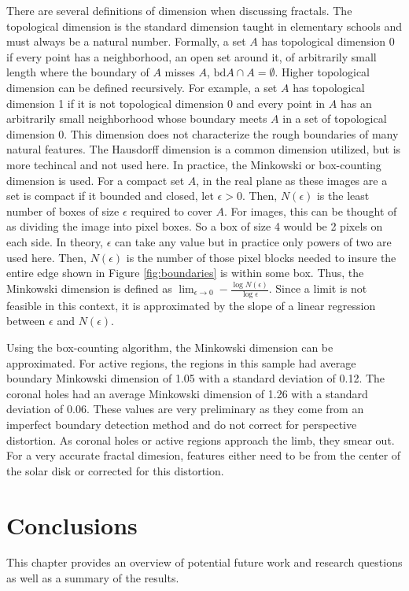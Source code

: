 \documentclass[twoside]{report}
\begin{document}
There are several definitions of dimension when discussing fractals. The topological dimension is the standard dimension taught in elementary schools and must always be a natural number. Formally, a set $A$ has topological dimension 0 if every point has a neighborhood, an open set around it, of arbitrarily small length where the boundary of $A$ misses $A$, $\text{bd} A \cap A = \emptyset$. Higher topological dimension can be defined recursively. For example, a set $A$ has topological dimension 1 if it is not topological dimension 0 and every point in $A$ has an arbitrarily small neighborhood whose boundary meets $A$ in a set of topological dimension 0. This dimension does not characterize the rough boundaries of many natural features. The Hausdorff dimension is a common dimension utilized, but is more techincal and not used here. In practice, the Minkowski or box-counting dimension is used. For a compact set $A$, in the real plane as these images are a set is compact if it bounded and closed, let $\epsilon > 0$. Then, $N(\epsilon)$ is the least number of boxes of size $\epsilon$ required to cover $A$. For images, this can be thought of as dividing the image into pixel boxes. So a box of size 4 would be 2 pixels on each side. In theory, $\epsilon$ can take any value but in practice only powers of two are used here. Then, $N(\epsilon)$ is the number of those pixel blocks needed to insure the entire edge shown in Figure \ref{fig:boundaries} is within some box. Thus, the Minkowski dimension is defined as $\lim_{\epsilon \to 0} - \frac{\log N(\epsilon)}{\log \epsilon}$. Since a limit is not feasible in this context, it is approximated by the slope of a linear regression between $\epsilon$ and $N(\epsilon)$. 

Using the box-counting algorithm, the Minkowski dimension can be approximated. For active regions, the regions in this sample had average boundary Minkowski dimension of 1.05 with a standard deviation of 0.12. The coronal holes had an average Minkowski dimension of 1.26 with a standard deviation of 0.06. These values are very preliminary as they come from an imperfect boundary detection method and do not correct for perspective distortion. As coronal holes or active regions approach the limb, they smear out. For a very accurate fractal dimesion, features either need to be from the center of the solar disk or corrected for this distortion.

\chapter{Conclusions} \label{ch:conclusion}
This chapter provides an overview of potential future work and research questions as well as a summary of the results.  
\end{document}
